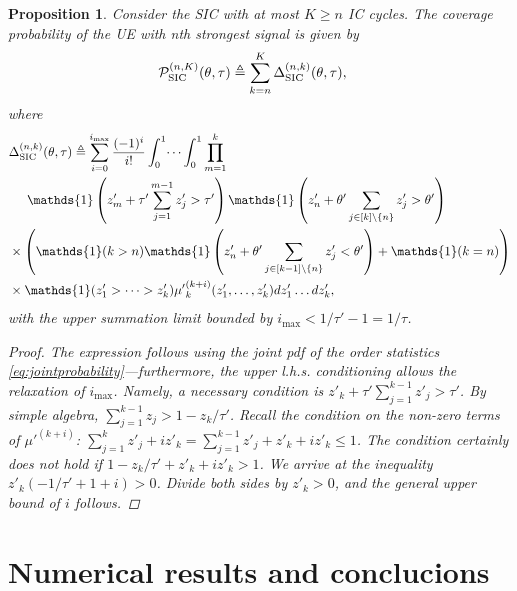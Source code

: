 \documentclass[lettersize,journal]{IEEEtran}
\newtheorem{prop}[theorem]{Proposition}
\begin{document}
\begin{prop}
  Consider the SIC with at most $K \geq n$ IC cycles. The coverage probability of the UE with n\textit{th} strongest signal is given by
  \begin{align}
    &\mathcal{P}^{(n,K)}_{\textup{SIC}}(\theta,\tau) \triangleq \sum_{k=n}^{K}\Delta^{(n,k)}_{\textup{SIC}}(\theta,\tau),
  \end{align}
  where
  \begin{align}
    \label{eq:SICprob}
    & \Delta^{(n,k)}_{\textup{SIC}}(\theta,\tau) \triangleq \sum^{i_{\text{max}}}_{i=0}\frac{(-1)^i}{i!} \int_{0}^{1} \dots \int_{0}^{1}\prod_{m=1}^k  \nonumber \\
    &\hspace{0.5cm}\mathds{1}\left( z'_m+ \tau'\sum_{j=1}^{m-1} z'_j>\tau' \right)  \mathds{1}\left(z'_n+  \theta'\sum_{j\in [k] \setminus \{n\}} z'_j>\theta' \right) \nonumber \\
    &\times \left(\mathds{1}(k>n)\mathds{1}\left(z'_n+ \theta'\sum_{j \in [k-1] \setminus \{n\}} z'_j<\theta' \right) + \mathds{1}(k=n) \right) \nonumber\\
    & \times \mathds{1}(z'_1>\dots>z'_k){\mu'}_k^{(k+i)}(z'_1,\dots,z'_k) d z'_1 \dots d z'_k,
  \end{align}
  with the upper summation limit bounded by $i_{\text{max}} < 1/\tau'-1=1/\tau$.
  \begin{proof}
    The expression follows using the joint pdf of the order statistics \eqref{eq:jointprobability}---furthermore, the upper l.h.s. conditioning  allows the relaxation of $i_{\text{max}}$. Namely, a necessary condition is $z'_{k}+\tau'\sum_{j=1}^{k-1}z'_{j}>\tau'$. By simple algebra, $\sum_{j=1}^{k-1}z_{j}> 1-z_{k}/\tau'$. Recall the condition on the non-zero terms of $\mu'^{(k+i)}$:  $\sum_{j=1}^k z'_{j}+i z'_{k} =\sum_{j=1}^{k-1}z'_{j} +z'_{k}+i z'_{k}  \leq 1$. The condition certainly does \textit{not} hold if $1-z_{k}/\tau'+ z'_{k}+i z'_{k}>1$. We arrive at the inequality $z'_{k} \left(-1/\tau' + 1 +i \right)>0$. Divide both sides by $z'_{k}>0$, and the general upper bound of $i$ follows.
  \end{proof}
\end{prop}




\section{Numerical results and conclucions}
  
\end{document}
